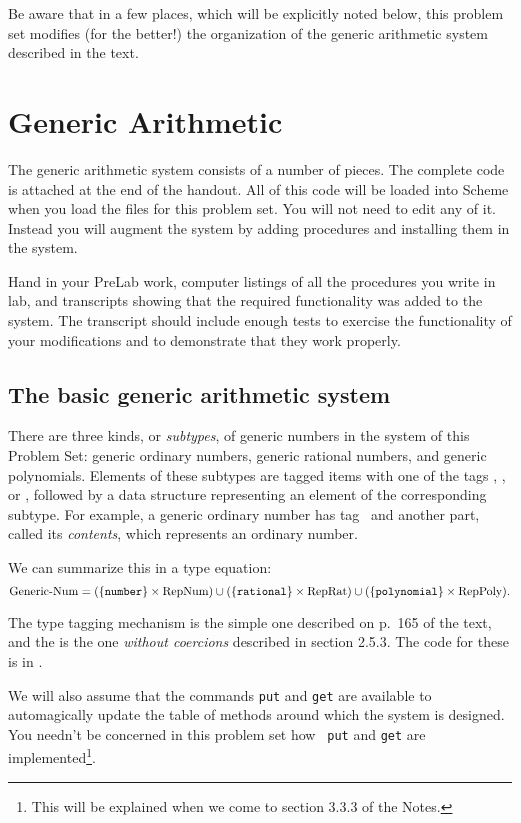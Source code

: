 Be aware that in a few places, which will be explicitly noted below,
this problem set modifies (for the better!) the organization of the
generic arithmetic system described in the text.

\section{Generic Arithmetic}

The generic arithmetic system consists of a number of pieces. The
complete code is attached at the end of the handout.  All of this code
will be loaded into Scheme when you load the files for this problem
set.  You will not need to edit any of it.  Instead you will augment
the system by adding procedures and installing them in the system.

Hand in your PreLab work, computer listings of all the procedures you
write in lab, and transcripts showing that the required functionality
was added to the system.  The transcript should include enough tests
to exercise the functionality of your modifications and to demonstrate
that they work properly.

\subsection{The basic generic arithmetic system} There are three kinds,
or {\em subtypes}, of generic numbers in the system of this Problem Set:
generic ordinary numbers, generic rational numbers, and generic
polynomials.  Elements of these subtypes are tagged items with one of
the tags \numtag, \rattag, or \polytag, followed by a data structure
representing an element of the corresponding subtype.  For example, a
generic ordinary number has tag \numtag\ and another part, called its
{\em contents}, which represents an ordinary number.

We can summarize this in a type equation:
\[\mbox{Generic-\-Num} = (\{\mbox{\tt number}\}\times \mbox{RepNum}) \cup (\{\mbox{\tt rational}\}\times \mbox{RepRat}) \cup
        (\{\mbox{\tt polynomial}\}\times \mbox{RepPoly}).\]

The type tagging mechanism is the simple one described on p.\ 165 of the
text, and the  is the one {\em without coercions}
described in section 2.5.3.  The code for these is in .

We will also assume that the commands {\tt put} and {\tt get} are
available to automagically update the table of methods around which the
system is designed.  You needn't be concerned in this problem set how {\tt
put} and {\tt get} are implemented\footnote{This will be explained when we
come to section 3.3.3 of the Notes.}.

